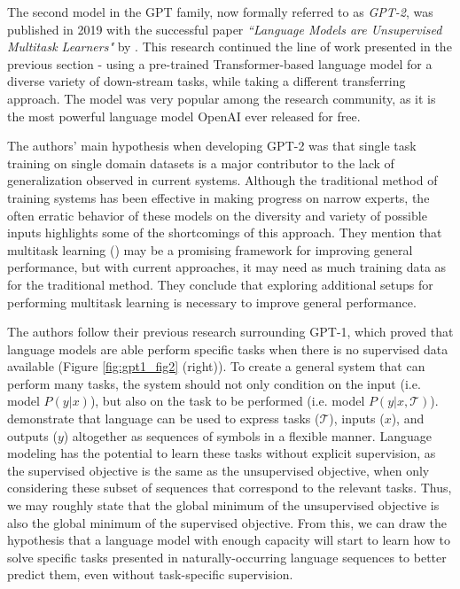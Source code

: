 \documentclass{article}
\begin{document}
The second model in the GPT family, now formally referred to as \emph{GPT-2}, was published in 2019 with the successful paper \emph{``Language Models are Unsupervised Multitask Learners"} by \citet{radford2019gpt2}. This research continued the line of work presented in the previous section - using a pre-trained Transformer-based language model for a diverse variety of down-stream tasks, while taking a different transferring approach. The model was very popular among the research community, as it is the most powerful language model OpenAI ever released for free.

\medskip
\noindent
The authors' main hypothesis when developing GPT-2 was that single task training on single domain datasets is a major contributor to the lack of generalization observed in current systems. Although the traditional method of training systems has been effective in making progress on narrow experts, the often erratic behavior of these models on the diversity and variety of possible inputs highlights some of the shortcomings of this approach. They mention that multitask learning (\citet{caruana1997multitask}) may be a promising framework for improving general performance, but with current approaches, it may need as much training data as for the traditional method. They conclude that exploring additional setups for performing multitask learning is necessary to improve general performance.

\medskip
\noindent
The authors follow their previous research surrounding GPT-1, which proved that language models are able perform specific tasks when there is no supervised data available (Figure \ref{fig:gpt1_fig2} (right)). To create a general system that can perform many tasks, the system should not only condition on the input (i.e. model $P(y|x)$), but also on the task to be performed (i.e. model $P(y|x,\mathcal{T})$). \citet{McCann2018multitask} demonstrate that language can be used to express tasks ($\mathcal{T}$), inputs ($x$), and outputs ($y$) altogether as sequences of symbols in a flexible manner. Language modeling has the potential to learn these tasks without explicit supervision, as the supervised objective is the same as the unsupervised objective, when only considering these subset of sequences that correspond to the relevant tasks. Thus, we may roughly state that the global minimum of the unsupervised objective is also the global minimum of the supervised objective. From this, we can draw the hypothesis that a language model with enough capacity will start to learn how to solve specific tasks presented in naturally-occurring language sequences to better predict them, even without task-specific supervision.
\end{document}
